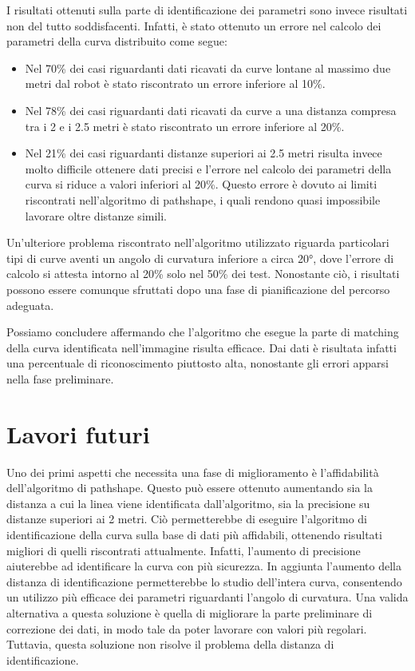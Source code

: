    I risultati ottenuti sulla parte di identificazione dei parametri sono invece risultati non del tutto soddisfacenti. Infatti, è stato ottenuto un errore nel calcolo dei parametri della curva distribuito come segue:
    \begin{itemize}
        \item Nel 70\% dei casi riguardanti dati ricavati da curve lontane al massimo due metri dal robot è stato riscontrato un errore inferiore al 10\%.
        \item Nel 78\% dei casi riguardanti dati ricavati da curve a una distanza compresa tra i 2 e i 2.5 metri è stato riscontrato un errore inferiore al 20\%.
        \item Nel 21\% dei casi riguardanti distanze superiori ai 2.5 metri risulta invece molto difficile ottenere dati precisi e l'errore nel calcolo dei parametri della curva si riduce a valori inferiori al 20\%. Questo errore è dovuto ai limiti riscontrati nell'algoritmo di pathshape, i quali rendono quasi impossibile lavorare oltre distanze simili.
    \end{itemize}
    Un'ulteriore problema riscontrato nell'algoritmo utilizzato riguarda particolari tipi di curve aventi un angolo di curvatura inferiore a circa 20°, dove l'errore di calcolo si attesta intorno al 20\% solo nel 50\% dei test. Nonostante ciò, i risultati possono essere comunque sfruttati dopo una fase di pianificazione del percorso adeguata.

    Possiamo concludere affermando che l'algoritmo che esegue la parte di matching della curva identificata nell'immagine risulta efficace. Dai dati è risultata infatti una percentuale di riconoscimento piuttosto alta, nonostante gli errori apparsi nella fase preliminare.

\section{Lavori futuri}
    Uno dei primi aspetti che necessita una fase di miglioramento è l'affidabilità dell'algoritmo di pathshape. Questo può essere ottenuto aumentando sia la distanza a cui la linea viene identificata dall'algoritmo, sia la precisione su distanze superiori ai 2 metri. Ciò permetterebbe di eseguire l'algoritmo di identificazione della curva sulla base di dati più affidabili, ottenendo risultati migliori di quelli riscontrati attualmente. Infatti, l'aumento di precisione aiuterebbe ad identificare la curva con più sicurezza. In aggiunta l'aumento della distanza di identificazione permetterebbe lo studio dell'intera curva, consentendo un utilizzo più efficace dei parametri riguardanti l'angolo di curvatura.
    Una valida alternativa a questa soluzione è quella di migliorare la parte preliminare di correzione dei dati, in modo tale da poter lavorare con valori più regolari. Tuttavia, questa soluzione non risolve il problema della distanza di identificazione.

